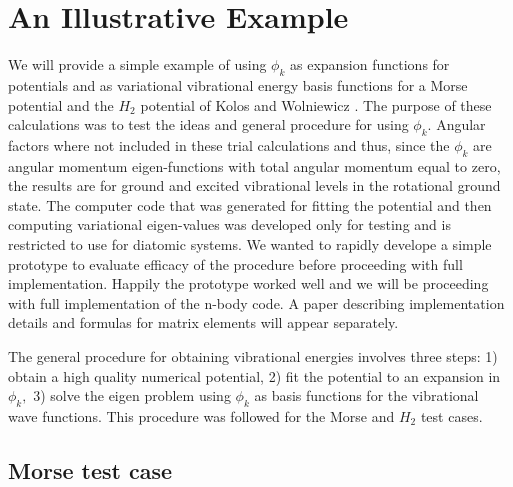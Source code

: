 \documentclass[12pt,thmsa]{article}
\begin{document}
\section{An Illustrative Example}

We will provide a simple example of using $\phi _k$ as expansion functions
for potentials and as variational vibrational energy basis functions for a
Morse potential and the $H_2$ potential of Kolos and Wolniewicz\cite{Kolos65}%
. The purpose of these calculations was to test the ideas and general
procedure for using $\phi _k$. Angular factors where not included in these
trial calculations and thus, since the $\phi _k$ are angular momentum
eigen-functions with total angular momentum equal to zero, the results are
for ground and excited vibrational levels in the rotational ground state.
The computer code that was generated for fitting the potential and then
computing variational eigen-values was developed only for testing and is
restricted to use for diatomic systems. We wanted to rapidly develope a
simple prototype to evaluate efficacy of the procedure before proceeding
with full implementation. Happily the prototype worked well and we will be
proceeding with full implementation of the n-body code. A paper describing
implementation details and formulas for matrix elements will appear
separately.

The general procedure for obtaining vibrational energies involves three
steps: 1) obtain a high quality numerical potential, 2) fit the potential to
an expansion in $\phi _k,$ 3) solve the eigen problem using $\phi _k$ as
basis functions for the vibrational wave functions. This procedure was
followed for the Morse and $H_2$ test cases.

\subsection{Morse test case}
\end{document}
